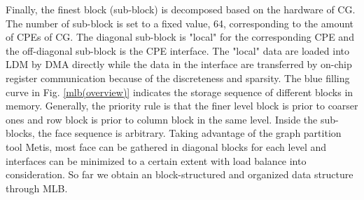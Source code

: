 \documentclass[conference]{IEEEtran}
\begin{document}
Finally, the finest block (sub-block) is decomposed based on the hardware of CG. The number of sub-block is set to a fixed value, 64, corresponding to the amount of CPEs of CG. The diagonal sub-block is "local" for the corresponding CPE and the off-diagonal sub-block is the CPE interface. The "local" data are loaded into LDM by DMA directly while the data in the interface are transferred by on-chip register communication because of the discreteness and sparsity. The blue filling curve in Fig. \ref{mlb(overview)} indicates the storage sequence of different blocks in memory. Generally, the priority rule is that the finer level block is prior to coarser ones and row block is prior to column block in the same level. Inside the sub-blocks, the face sequence is arbitrary. Taking advantage of the graph partition tool Metis, most face can be gathered in diagonal blocks for each level and interfaces can be minimized to a certain extent with load balance into consideration. So far we obtain an block-structured and organized data structure through MLB.
\end{document}
